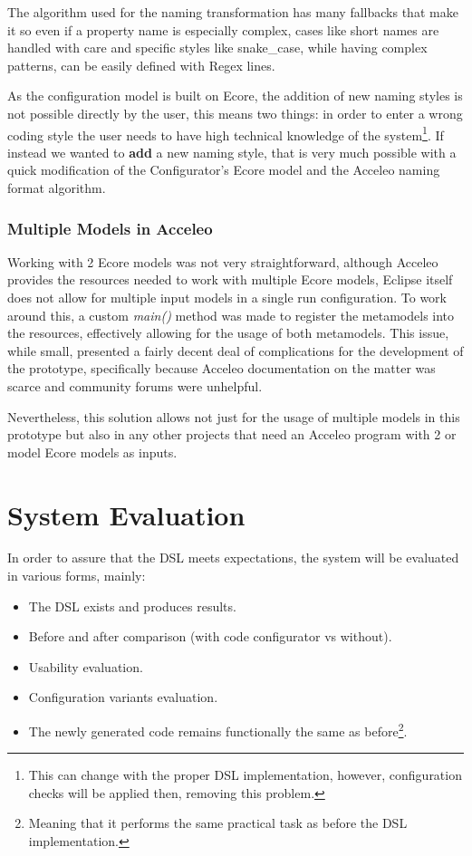 The algorithm used for the naming transformation has many fallbacks that make it so even if a property name is especially complex, cases like short names are handled with care and specific styles like snake\_case, while having complex patterns, can be easily defined with Regex lines. 

As the configuration model is built on Ecore, the addition of new naming styles is not possible directly by the user, this means two things: in order to enter a wrong coding style the user needs to have high technical knowledge of the system\footnote{This can change with the proper DSL implementation, however, configuration checks will be applied then, removing this problem.}. If instead we wanted to \textbf{add} a new naming style, that is very much possible with a quick modification of the Configurator's Ecore model and the Acceleo naming format algorithm.

\subsubsection{Multiple Models in Acceleo}

Working with 2 Ecore models was not very straightforward, although Acceleo provides the resources needed to work with multiple Ecore models, Eclipse itself does not allow for multiple input models in a single run configuration. To work around this, a custom \textit{main()} method was made to register the metamodels into the resources, effectively allowing for the usage of both metamodels. This issue, while small, presented a fairly decent deal of complications for the development of the prototype, specifically because Acceleo documentation on the matter was scarce and community forums were unhelpful.

Nevertheless, this solution allows not just for the usage of multiple models in this prototype but also in any other projects that need an Acceleo program with 2 or model Ecore models as inputs.


\section{System Evaluation}
\label{sec:sys_eval}

In order to assure that the \gls{DSL} meets expectations, the system will be evaluated in various forms, mainly:

\begin{itemize}
	\item The \gls{DSL} exists and produces results.
	\item Before and after comparison (with code configurator vs without).
	\item Usability evaluation.
	\item Configuration variants evaluation.
	\item The newly generated code remains functionally the same as before\footnote{Meaning that it performs the same practical task as before the \gls{DSL} implementation.}.
\end{itemize}

